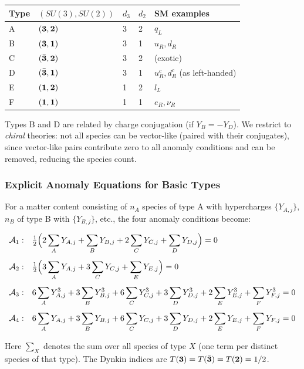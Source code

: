 \documentclass[12pt, a4paper]{article}
\begin{document}
\begin{formalbox}[title={DEF-AM04: Basic species types}]
\renewcommand{\arraystretch}{1.30}
{\small
\begin{tabular}{p{0.6cm} p{2.8cm} p{1.2cm} p{1.2cm} p{3.5cm}}
\toprule
\textbf{Type} & \textbf{$(SU(3), SU(2))$} & $d_3$ & $d_2$ &
\textbf{SM examples} \\
\midrule
A & $({\bf 3}, {\bf 2})$ & 3 & 2 & $q_L$ \\
B & $({\bf 3}, {\bf 1})$ & 3 & 1 & $u_R, d_R$ \\
C & $(\bar{\bf 3}, {\bf 2})$ & 3 & 2 & (exotic) \\
D & $(\bar{\bf 3}, {\bf 1})$ & 3 & 1 & $u_R^c, d_R^c$ (as left-handed) \\
E & $({\bf 1}, {\bf 2})$ & 1 & 2 & $l_L$ \\
F & $({\bf 1}, {\bf 1})$ & 1 & 1 & $e_R, \nu_R$ \\
\bottomrule
\end{tabular}
}

\smallskip
Types B and D are related by charge conjugation (if $Y_B = -Y_D$).
We restrict to \emph{chiral} theories: not all species can be
vector-like (paired with their conjugates), since vector-like
pairs contribute zero to all anomaly conditions and can be removed,
reducing the species count.
\end{formalbox}

\subsubsection{Explicit Anomaly Equations for Basic Types}

For a matter content consisting of $n_A$ species of type A with
hypercharges $\{Y_{A,j}\}$, $n_B$ of type B with $\{Y_{B,j}\}$,
etc., the four anomaly conditions become:

\begin{formalbox}[title={Anomaly system for basic types (EQ-AM01--04)}]
\begin{align}
  \mathcal{A}_1:&\quad
  \tfrac{1}{2}\Bigl(2\sum_A Y_{A,j} + \sum_B Y_{B,j}
    + 2\sum_C Y_{C,j} + \sum_D Y_{D,j}\Bigr) = 0
  \label{eq:AM1} \\[4pt]
  \mathcal{A}_2:&\quad
  \tfrac{1}{2}\Bigl(3\sum_A Y_{A,j} + 3\sum_C Y_{C,j}
    + \sum_E Y_{E,j}\Bigr) = 0
  \label{eq:AM2} \\[4pt]
  \mathcal{A}_3:&\quad
  6\sum_A Y_{A,j}^3 + 3\sum_B Y_{B,j}^3
    + 6\sum_C Y_{C,j}^3 + 3\sum_D Y_{D,j}^3
    + 2\sum_E Y_{E,j}^3 + \sum_F Y_{F,j}^3 = 0
  \label{eq:AM3} \\[4pt]
  \mathcal{A}_4:&\quad
  6\sum_A Y_{A,j} + 3\sum_B Y_{B,j}
    + 6\sum_C Y_{C,j} + 3\sum_D Y_{D,j}
    + 2\sum_E Y_{E,j} + \sum_F Y_{F,j} = 0
  \label{eq:AM4}
\end{align}

Here $\sum_X$ denotes the sum over all species of type $X$
(one term per distinct species of that type). The Dynkin indices
are $T({\bf 3}) = T(\bar{\bf 3}) = T({\bf 2}) = 1/2$.
\end{formalbox}
\end{document}
